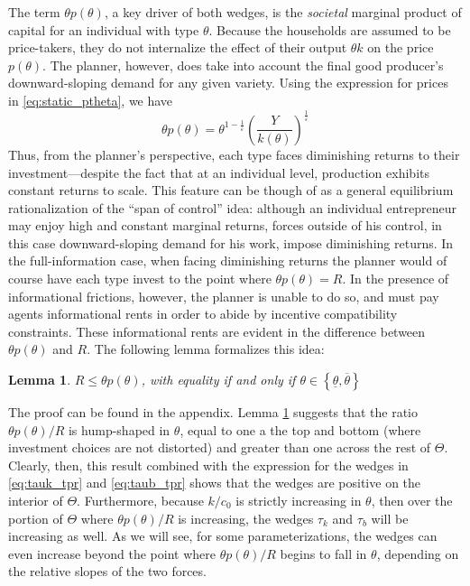 \documentclass[11pt]{article}
\newtheorem{lemma}{Lemma}
\begin{document}
The term \( \theta p\left( \theta \right) \), a key driver of both wedges, is the \textit{societal} marginal product of capital for an individual with type \( \theta \). Because the households are assumed to be price-takers, they do not internalize the effect of their output \( \theta k \) on the price \( p(\theta) \). The planner, however, does take into account the final good producer's downward-sloping demand for any given variety. Using the expression for prices in \eqref{eq:static_ptheta}, we have 
\begin{equation}
    \theta p(\theta) = \theta^{1-\frac{1}{\varepsilon}} \left(\frac{Y}{ k\left(\theta\right)}\right)^{\frac{1}{\varepsilon}}
\end{equation}
Thus, from the planner's perspective, each type faces diminishing returns to their investment---despite the fact that at an individual level, production exhibits constant returns to scale. This feature can be though of as a general equilibrium rationalization of the \cite{lucas1978size} ``span of control'' idea: although an individual entrepreneur may enjoy high and constant marginal returns, forces outside of his control, in this case downward-sloping demand for his work, impose diminishing returns. In the full-information case, when facing diminishing returns the planner would of course have each type invest to the point where \( \theta p(\theta) = R \). In the presence of informational frictions, however, the planner is unable to do so, and must pay agents informational rents in order to abide by incentive compatibility constraints. These informational rents are evident in the difference between \( \theta p(\theta) \) and \( R \). The following lemma formalizes this idea:

\begin{lemma} \label{lem:thetap}
    \( R\le\theta p(\theta) \), with equality if and only if \( \theta\in\left\{ \underline{\theta},\overline{\theta}\right\}  \)
\end{lemma}

The proof can be found in the appendix. Lemma \ref{lem:thetap} suggests that the ratio \( \theta p(\theta) /R\) is hump-shaped in \( \theta \), equal to one a the top and bottom (where investment choices are not distorted) and greater than one across the rest of \( \Theta \). Clearly, then, this result combined with the expression for the wedges in \eqref{eq:tauk_tpr} and \eqref{eq:taub_tpr} shows that the wedges are positive on the interior of \( \Theta \). Furthermore, because \( k/c_0 \) is strictly increasing in \( \theta \), then over the portion of \( \Theta \) where \( \theta p(\theta) /R\) is increasing, the wedges \( \tau_k \) and \( \tau_b \) will be increasing as well. As we will see, for some parameterizations, the wedges can even increase beyond the point where \( \theta p(\theta) /R\) begins to fall in \( \theta \), depending on the relative slopes of the two forces. 
\end{document}
